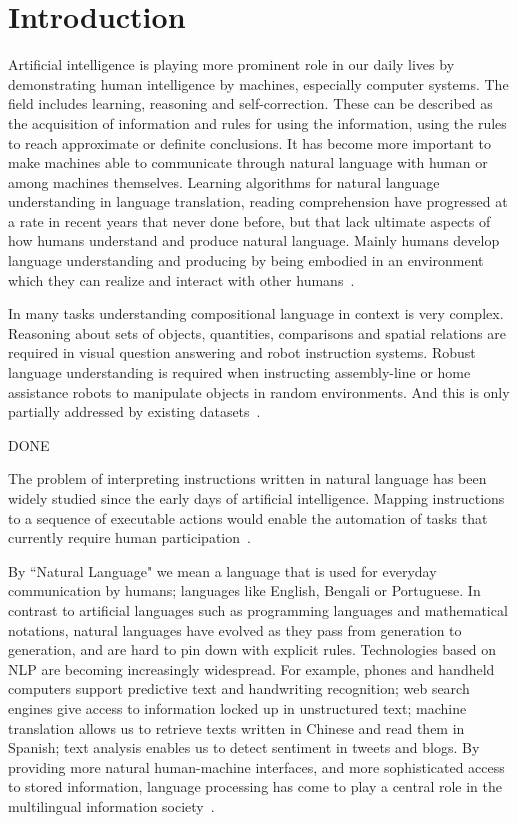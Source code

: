 \chapter{Introduction}
Artificial intelligence is playing more prominent role in our daily lives by demonstrating human intelligence by machines, especially computer systems. The field includes learning, reasoning and self-correction. These can be described as the acquisition of information and rules for using the information, using the rules to reach approximate or definite conclusions. It has become more important to make machines able to communicate through natural language with human or among machines themselves. Learning algorithms for natural language understanding in language translation, reading comprehension have progressed at a rate in recent years that never done before, but that lack ultimate aspects of how humans understand and produce natural language. Mainly humans develop language understanding and producing by being embodied in an environment which they can realize and interact with other humans~\cite{DBLP:journals/corr/abs-1807-03367}.

In many tasks understanding compositional language in context is very complex. Reasoning about sets of objects, quantities, comparisons and spatial relations are required in visual question answering and robot instruction systems. Robust language understanding is required when instructing assembly-line or home assistance robots to manipulate objects in random environments. And this is only partially addressed by existing datasets~\cite{Suhr2017ACO}.

DONE

The problem of interpreting instructions written in natural language has been widely studied since the early days of artificial intelligence.  Mapping instructions to a sequence of executable actions would enable the automation of tasks that currently require human participation~\cite{RL}.

By ``Natural Language" we mean a language that is used for everyday communication by humans; languages like English, Bengali or Portuguese. In contrast to artificial languages such as programming languages and mathematical notations, natural languages have evolved as they pass from generation to generation, and are hard to pin down with explicit rules. Technologies based on NLP are becoming increasingly widespread. For example, phones and handheld computers support predictive text and handwriting recognition; web search engines give access to information locked up in unstructured text; machine translation allows us to retrieve texts written in Chinese and read them in Spanish; text analysis enables us to detect sentiment in tweets and blogs. By providing more natural human-machine interfaces, and more sophisticated access to stored information, language processing has come to play a central role in the multilingual information society~\cite{NLPbook}.

